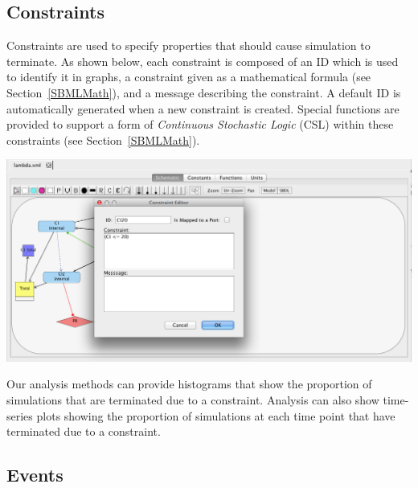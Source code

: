 \documentclass[titlepage,11pt]{article}
\begin{document}
\clearpage

\subsection{\label{Constraints}Constraints}

\noindent
Constraints are used to specify properties that should cause simulation to terminate.  As shown below, each constraint is composed of an ID which is used to identify it in graphs, a constraint given as a mathematical formula (see Section~\ref{SBMLMath}), and a message describing the constraint.  A default ID is automatically generated when a new constraint is created.
Special functions are provided to support a form of \emph{Continuous Stochastic Logic} (CSL) within these constraints (see Section~\ref{SBMLMath}).  

\begin{center}
\includegraphics[width=160mm]{screenshots/constraint}
\end{center}

Our analysis methods can provide histograms that show the proportion of simulations that are terminated due to a constraint.  Analysis can also show time-series plots showing the proportion of simulations at each time point that have terminated due to a constraint. 

\clearpage

\subsection{\label{Events}Events}
\end{document}
